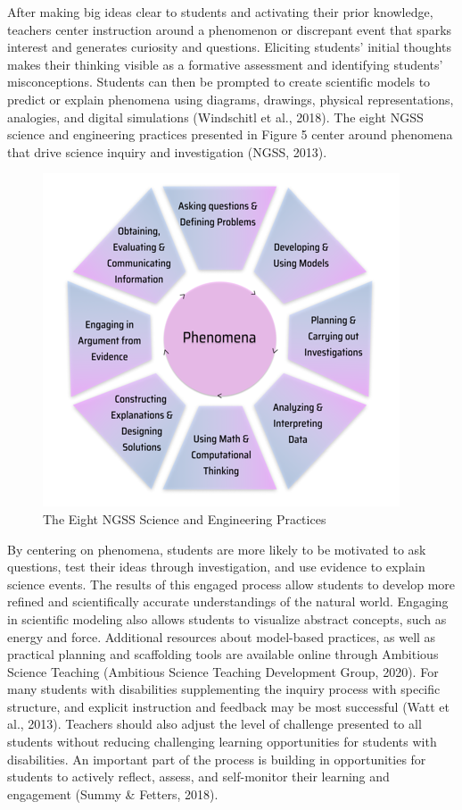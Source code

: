 \documentclass[11.5pt]{sig-alternate}
\begin{document}
\begin{large}
After making big ideas clear to students and activating their prior knowledge, teachers center instruction around a phenomenon or discrepant event that sparks interest and generates curiosity and questions. Eliciting students’ initial thoughts makes their thinking visible as a formative assessment and identifying students’ misconceptions. Students can then be prompted to create scientific models to predict or explain phenomena using diagrams, drawings, physical representations, analogies, and digital simulations (Windschitl et al., 2018). The eight NGSS science and engineering practices presented in Figure 5 center around phenomena that drive science inquiry and investigation (NGSS, 2013). 
\addtocounter{figure}{1}
\begin{figure}[t]
    \centering
    \includegraphics[width=1\linewidth]{fig4.png}
    \caption{The Eight NGSS Science and Engineering Practices}
\end{figure}

By centering on phenomena, students are more likely to be motivated to ask questions, test their ideas through investigation, and use evidence to explain science events. The results of this engaged process allow students to develop more refined and scientifically accurate understandings of the natural world. Engaging in scientific modeling also allows students to visualize abstract concepts, such as energy and force. Additional resources about model-based practices, as well as practical planning and scaffolding tools are available online through Ambitious Science Teaching (Ambitious Science Teaching Development Group, 2020). For many students with disabilities supplementing the inquiry process with specific structure, and explicit instruction and feedback may be most successful (Watt et al., 2013). Teachers should also adjust the level of challenge presented to all students without reducing challenging learning opportunities for students with disabilities. An important part of the process is building in opportunities for students to actively reflect, assess, and self-monitor their learning and engagement (Summy \& Fetters, 2018).


\end{large}
\end{document}
